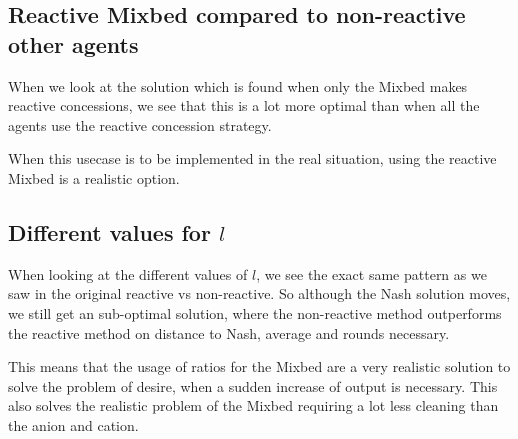 \clearpage
\subsection{Reactive Mixbed compared to non-reactive other agents}
When we look at the solution which is found when only the Mixbed makes reactive concessions, we see that this is a lot more optimal than when all the agents use the reactive concession strategy. 

When this usecase is to be implemented in the real situation, using the reactive Mixbed is a realistic option. 

\subsection{Different values for $l$}
When looking at the different values of $l$, we see the exact same pattern as we saw in the original reactive vs non-reactive. So although the Nash solution moves, we still get an sub-optimal solution, where the non-reactive method outperforms the reactive method on distance to Nash, average and rounds necessary.

This means that the usage of ratios for the Mixbed are a very realistic solution to solve the problem of desire, when a sudden increase of output is necessary. This also solves the realistic problem of the Mixbed requiring a lot less cleaning than the anion and cation.



